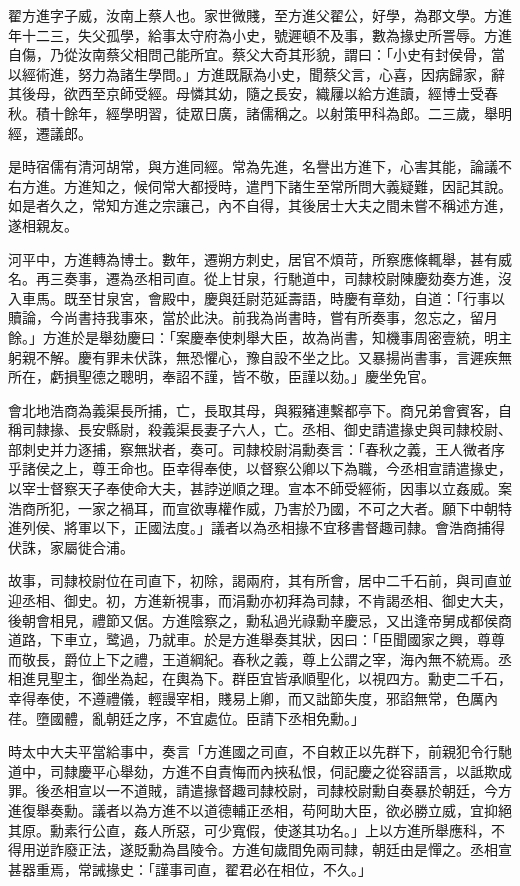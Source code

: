 
\begin{pinyinscope}
翟方進字子威，汝南上蔡人也。家世微賤，至方進父翟公，好學，為郡文學。方進年十二三，失父孤學，給事太守府為小史，號遲頓不及事，數為掾史所詈辱。方進自傷，乃從汝南蔡父相問己能所宜。蔡父大奇其形貌，謂曰：「小史有封侯骨，當以經術進，努力為諸生學問。」方進既厭為小史，聞蔡父言，心喜，因病歸家，辭其後母，欲西至京師受經。母憐其幼，隨之長安，織屨以給方進讀，經博士受春秋。積十餘年，經學明習，徒眾日廣，諸儒稱之。以射策甲科為郎。二三歲，舉明經，遷議郎。

是時宿儒有清河胡常，與方進同經。常為先進，名譽出方進下，心害其能，論議不右方進。方進知之，候伺常大都授時，遣門下諸生至常所問大義疑難，因記其說。如是者久之，常知方進之宗讓己，內不自得，其後居士大夫之間未嘗不稱述方進，遂相親友。

河平中，方進轉為博士。數年，遷朔方刺史，居官不煩苛，所察應條輒舉，甚有威名。再三奏事，遷為丞相司直。從上甘泉，行馳道中，司隸校尉陳慶劾奏方進，沒入車馬。既至甘泉宮，會殿中，慶與廷尉范延壽語，時慶有章劾，自道：「行事以贖論，今尚書持我事來，當於此決。前我為尚書時，嘗有所奏事，忽忘之，留月餘。」方進於是舉劾慶曰：「案慶奉使刺舉大臣，故為尚書，知機事周密壹統，明主躬親不解。慶有罪未伏誅，無恐懼心，豫自設不坐之比。又暴揚尚書事，言遲疾無所在，虧損聖德之聰明，奉詔不謹，皆不敬，臣謹以劾。」慶坐免官。

會北地浩商為義渠長所捕，亡，長取其母，與豭豬連繫都亭下。商兄弟會賓客，自稱司隸掾、長安縣尉，殺義渠長妻子六人，亡。丞相、御史請遣掾史與司隸校尉、部刺史并力逐捕，察無狀者，奏可。司隸校尉涓勳奏言：「春秋之義，王人微者序乎諸侯之上，尊王命也。臣幸得奉使，以督察公卿以下為職，今丞相宣請遣掾史，以宰士督察天子奉使命大夫，甚誖逆順之理。宣本不師受經術，因事以立姦威。案浩商所犯，一家之禍耳，而宣欲專權作威，乃害於乃國，不可之大者。願下中朝特進列侯、將軍以下，正國法度。」議者以為丞相掾不宜移書督趣司隸。會浩商捕得伏誅，家屬徙合浦。

故事，司隸校尉位在司直下，初除，謁兩府，其有所會，居中二千石前，與司直並迎丞相、御史。初，方進新視事，而涓勳亦初拜為司隸，不肯謁丞相、御史大夫，後朝會相見，禮節又倨。方進陰察之，勳私過光祿勳辛慶忌，又出逢帝舅成都侯商道路，下車立，鹭過，乃就車。於是方進舉奏其狀，因曰：「臣聞國家之興，尊尊而敬長，爵位上下之禮，王道綱紀。春秋之義，尊上公謂之宰，海內無不統焉。丞相進見聖主，御坐為起，在輿為下。群臣宜皆承順聖化，以視四方。勳吏二千石，幸得奉使，不遵禮儀，輕謾宰相，賤易上卿，而又詘節失度，邪諂無常，色厲內荏。墮國體，亂朝廷之序，不宜處位。臣請下丞相免勳。」

時太中大夫平當給事中，奏言「方進國之司直，不自敕正以先群下，前親犯令行馳道中，司隸慶平心舉劾，方進不自責悔而內挾私恨，伺記慶之從容語言，以詆欺成罪。後丞相宣以一不道賊，請遣掾督趣司隸校尉，司隸校尉勳自奏暴於朝廷，今方進復舉奏勳。議者以為方進不以道德輔正丞相，苟阿助大臣，欲必勝立威，宜抑絕其原。勳素行公直，姦人所惡，可少寬假，使遂其功名。」上以方進所舉應科，不得用逆詐廢正法，遂貶勳為昌陵令。方進旬歲間免兩司隸，朝廷由是憚之。丞相宣甚器重焉，常誡掾史：「謹事司直，翟君必在相位，不久。」


\end{pinyinscope}
